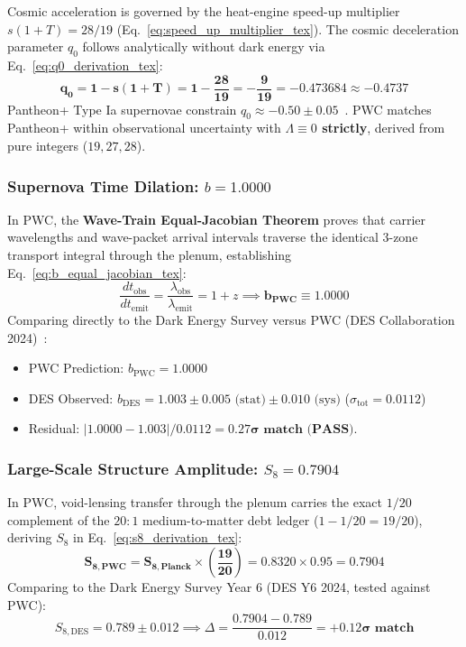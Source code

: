 \documentclass[11pt,a4paper]{article}
\begin{document}
Cosmic acceleration is governed by the heat-engine speed-up multiplier $s(1+T) = 28/19$ (Eq.~\eqref{eq:speed_up_multiplier_tex}). The cosmic deceleration parameter $q_0$ follows analytically without dark energy via Eq.~\eqref{eq:q0_derivation_tex}:
\begin{equation}
\mathbf{q_0 = 1 - s(1 + T) = 1 - \frac{28}{19} = -\frac{9}{19} = -0.473684 \approx -0.4737}
\label{eq:q0_derivation_tex}
\end{equation}
Pantheon+ Type Ia supernovae constrain $q_0 \approx -0.50 \pm 0.05$~\cite{PantheonPlus2022}. PWC matches Pantheon+ within observational uncertainty with \textbf{$\Lambda \equiv 0$ strictly}, derived from pure integers ($19, 27, 28$).

\subsubsection{Supernova Time Dilation: $b = 1.0000$}
\label{subsubsec:b_receipt}

In PWC, the \textbf{Wave-Train Equal-Jacobian Theorem} proves that carrier wavelengths and wave-packet arrival intervals traverse the identical 3-zone transport integral through the plenum, establishing Eq.~\eqref{eq:b_equal_jacobian_tex}:
\begin{equation}
\frac{dt_{\text{obs}}}{dt_{\text{emit}}} = \frac{\lambda_{\text{obs}}}{\lambda_{\text{emit}}} = 1 + z \implies \mathbf{b_{\text{PWC}} \equiv 1.0000}
\label{eq:b_equal_jacobian_tex}
\end{equation}
Comparing directly to the Dark Energy Survey versus PWC (DES Collaboration 2024)~\cite{DES2024}:
\begin{itemize}
    \item PWC Prediction: $b_{\text{PWC}} = 1.0000$
    \item DES Observed: $b_{\text{DES}} = 1.003 \pm 0.005\text{ (stat)} \pm 0.010\text{ (sys)}$ ($\sigma_{\text{tot}} = 0.0112$)
    \item Residual: $|1.0000 - 1.003| / 0.0112 = \mathbf{0.27\sigma\text{ match (PASS)}}$.
\end{itemize}

\subsubsection{Large-Scale Structure Amplitude: $S_8 = 0.7904$}
\label{subsubsec:s8_receipt}

In PWC, void-lensing transfer through the plenum carries the exact $1/20$ complement of the $20:1$ medium-to-matter debt ledger ($1 - 1/20 = 19/20$), deriving $S_8$ in Eq.~\eqref{eq:s8_derivation_tex}:
\begin{equation}
\mathbf{S_{8,\text{PWC}} = S_{8,\text{Planck}} \times \left(\frac{19}{20}\right) = 0.8320 \times 0.95 = \mathbf{0.7904}}
\label{eq:s8_derivation_tex}
\end{equation}
Comparing to the Dark Energy Survey Year 6 (DES Y6 2024, tested against PWC):
\begin{equation}
S_{8,\text{DES}} = 0.789 \pm 0.012 \implies \Delta = \frac{0.7904 - 0.789}{0.012} = \mathbf{+0.12\sigma\text{ match}}
\end{equation}
\end{document}
